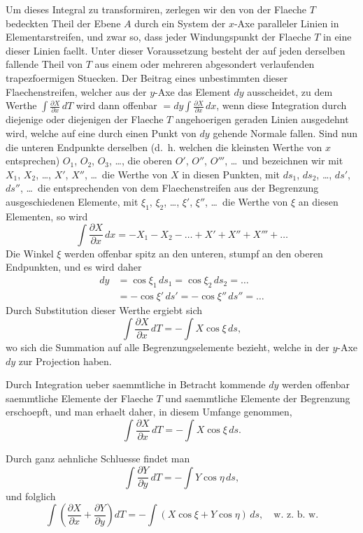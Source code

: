 \documentclass[12pt,a4paper]{book}
\theoremstyle{definition}
\theoremstyle{remark}
\begin{document}
Um dieses Integral zu transformiren, zerlegen wir den von der Flaeche $T$ bedeckten Theil der Ebene $A$ durch ein System der $x$-Axe paralleler Linien in Elementarstreifen, und zwar so, dass jeder Windungspunkt der Flaeche $T$ in eine dieser Linien faellt. Unter dieser Voraussetzung besteht der auf jeden derselben fallende Theil von $T$ aus einem oder mehreren abgesondert verlaufenden trapezfoermigen Stuecken. Der Beitrag eines unbestimmten dieser Flaechenstreifen, welcher aus der $y$-Axe das Element $dy$ ausscheidet, zu dem Werthe $\int \frac{\partial X}{\partial x} \, dT$ wird dann offenbar $= dy \int \frac{\partial X}{\partial x} \, dx$, wenn diese Integration durch diejenige oder diejenigen der Flaeche $T$ angehoerigen geraden Linien ausgedehnt wird, welche auf eine durch einen Punkt von $dy$ gehende Normale fallen. Sind nun die unteren Endpunkte derselben (d.\ h. welchen die kleinsten Werthe von $x$ entsprechen) $O_1$, $O_2$, $O_3$, \dots, die oberen $O'$, $O''$, $O'''$, \dots\ und bezeichnen wir mit $X_1$, $X_2$, \dots, $X'$, $X''$, \dots\ die Werthe von $X$ in diesen Punkten, mit $ds_1$, $ds_2$, \dots, $ds'$, $ds''$, \dots\ die entsprechenden von dem Flaechenstreifen aus der Begrenzung ausgeschiedenen Elemente, mit $\xi_1$, $\xi_2$, \dots, $\xi'$, $\xi''$, \dots\ die Werthe von $\xi$ an diesen Elementen, so wird
\[
\int \frac{\partial X}{\partial x} \, dx = -X_1 - X_2 - \dots + X' + X'' + X''' + \dots
\]
Die Winkel $\xi$ werden offenbar spitz an den unteren, stumpf an den oberen Endpunkten, und es wird daher
\begin{align*}
dy &= \cos\xi_1 \, ds_1 = \cos\xi_2 \, ds_2 = \dots \\
   &= -\cos\xi' \, ds' = -\cos\xi'' \, ds'' = \dots
\end{align*}
Durch Substitution dieser Werthe ergiebt sich
\[
\int \frac{\partial X}{\partial x} \, dT = -\int X \cos\xi \, ds,
\]
wo sich die Summation auf alle Begrenzungselemente bezieht, welche in der $y$-Axe $dy$ zur Projection haben.

Durch Integration ueber saemmtliche in Betracht kommende $dy$ werden offenbar saemmtliche Elemente der Flaeche $T$ und saemmtliche Elemente der Begrenzung erschoepft, und man erhaelt daher, in diesem Umfange genommen,
\[
\int \frac{\partial X}{\partial x} \, dT = -\int X \cos\xi \, ds.
\]

Durch ganz aehnliche Schluesse findet man
\[
\int \frac{\partial Y}{\partial y} \, dT = -\int Y \cos\eta \, ds,
\]
und folglich
\begin{equation}
\int \left(\frac{\partial X}{\partial x} + \frac{\partial Y}{\partial y}\right) dT = -\int (X \cos\xi + Y \cos\eta) \, ds, \quad \text{w.\ z.\ b.\ w.}
\end{equation}
\end{document}
